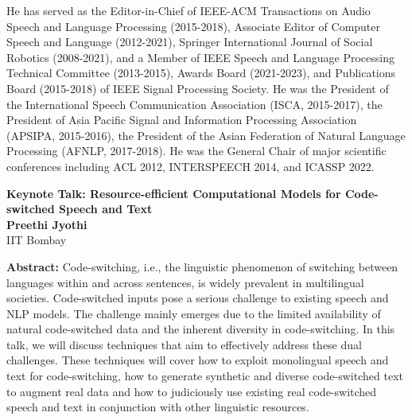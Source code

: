 \documentclass[11pt,oneside]{book}
\begin{document}
He has served as the Editor-in-Chief of IEEE-ACM Transactions on Audio Speech and Language Processing (2015-2018), Associate Editor of Computer Speech and Language (2012-2021), Springer International Journal of Social Robotics (2008-2021), and a Member of IEEE Speech and Language Processing Technical Committee (2013-2015), Awards Board (2021-2023), and Publications Board (2015-2018) of IEEE Signal Processing Society. He was the President of the International Speech Communication Association (ISCA, 2015-2017), the President of Asia Pacific Signal and Information Processing Association (APSIPA, 2015-2016), the President of the Asian Federation of Natural Language Processing (AFNLP, 2017-2018). He was the General Chair of major scientific conferences including ACL 2012, INTERSPEECH 2014, and ICASSP 2022.

  \newpage
  \begin{center}
    {\LARGE \textbf{Keynote Talk: Resource-efficient Computational Models for Code-switched Speech and Text}\\}
    \vspace*{0.5cm}
    \textbf{Preethi Jyothi}\\
        IIT Bombay\\
        
        
                
  \end{center}

  \vspace*{0.2cm}
    \textbf{Abstract:} Code-switching, i.e., the linguistic phenomenon of switching between languages within and across sentences, is widely prevalent in multilingual societies. Code-switched inputs pose a serious challenge to existing speech and NLP models. The challenge mainly emerges due to the limited availability of natural code-switched data and the inherent diversity in code-switching. In this talk, we will discuss techniques that aim to effectively address these dual challenges. These techniques will cover how to exploit monolingual speech and text for code-switching, how to generate synthetic and diverse code-switched text to augment real data and how to judiciously use existing real code-switched speech and text in conjunction with other linguistic resources.\\
  \newline
  
\end{document}
